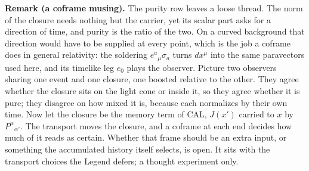 \documentclass[10pt]{article}
\begin{document}
\vspace{2pt}
\begin{smallbox}
\textbf{Remark (a coframe musing).} The purity row leaves a loose thread. The norm of the closure needs nothing but the carrier, yet its scalar part asks for a direction of time, and purity is the ratio of the two. On a curved background that direction would have to be supplied at every point, which is the job a coframe does in general relativity: the soldering $e^a{}_\mu\sigma_a$ turns $dx^\mu$ into the same paravectors used here, and its timelike leg $e_0$ plays the observer. Picture two observers sharing one event and one closure, one boosted relative to the other. They agree whether the closure sits on the light cone or inside it, so they agree whether it is pure; they disagree on how mixed it is, because each normalizes by their own time. Now let the closure be the memory term of CAL, $J(x')$ carried to $x$ by $P^\alpha{}_{\alpha'}$. The transport moves the closure, and a coframe at each end decides how much of it reads as certain. Whether that frame should be an extra input, or something the accumulated history itself selects, is open. It sits with the transport choices the Legend defers; a thought experiment only.
\end{smallbox}
\vspace{1pt}
\end{document}
